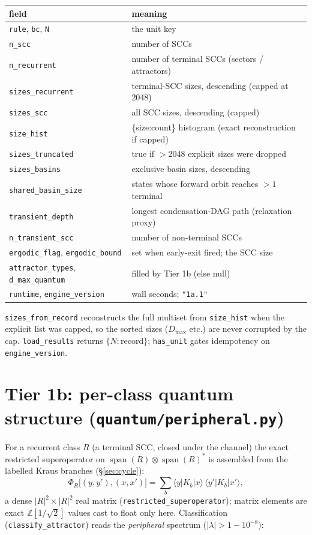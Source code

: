\documentclass[11pt]{article}
\newcommand{\rt}[1]{\texttt{#1}}
\newcommand{\pf}[1]{\texttt{#1}}          %
\newcommand{\fn}[1]{\texttt{#1}}          %
\providecommand{\ket}[1]{|#1\rangle}
\providecommand{\bra}[1]{\langle #1|}
\newcommand{\Zh}{\mathbb{Z}[1/\sqrt2]}
\begin{document}
\begin{center}\small
\begin{tabular}{@{}ll@{}}
\toprule
field & meaning \\
\midrule
\rt{rule}, \rt{bc}, \rt{N} & the unit key \\
\rt{n\_scc} & number of SCCs \\
\rt{n\_recurrent} & number of terminal SCCs (sectors / attractors) \\
\rt{sizes\_recurrent} & terminal-SCC sizes, descending (capped at 2048) \\
\rt{sizes\_scc} & all SCC sizes, descending (capped) \\
\rt{size\_hist} & \{size:count\} histogram (exact reconstruction if capped) \\
\rt{sizes\_truncated} & true if $>$2048 explicit sizes were dropped \\
\rt{sizes\_basins} & exclusive basin sizes, descending \\
\rt{shared\_basin\_size} & states whose forward orbit reaches $>1$ terminal \\
\rt{transient\_depth} & longest condensation-DAG path (relaxation proxy) \\
\rt{n\_transient\_scc} & number of non-terminal SCCs \\
\rt{ergodic\_flag}, \rt{ergodic\_bound} & set when early-exit fired; the SCC size \\
\rt{attractor\_types}, \rt{d\_max\_quantum} & filled by Tier 1b (else null) \\
\rt{runtime}, \rt{engine\_version} & wall seconds; \rt{"1a.1"} \\
\bottomrule
\end{tabular}
\end{center}

\fn{sizes\_from\_record} reconstructs the full multiset from \rt{size\_hist} when
the explicit list was capped, so the sorted sizes ($D_{\max}$ etc.) are never
corrupted by the cap. \fn{load\_results} returns $\{N:\text{record}\}$;
\fn{has\_unit} gates idempotency on \rt{engine\_version}.

\section{Tier 1b: per-class quantum structure (\pf{quantum/peripheral.py})}
\label{sec:tier1b}
For a recurrent class $R$ (a terminal SCC, closed under the channel) the exact
restricted superoperator on $\operatorname{span}(R)\otimes\operatorname{span}(R)^*$
is assembled from the labelled Kraus branches (\S\ref{sec:cycle}):
\begin{equation}
\Phi_R\big[(y,y'),(x,x')\big]=\sum_b \bra{y}K_b\ket{x}\,\overline{\bra{y'}K_b\ket{x'}},
\label{eq:phiR}
\end{equation}
a dense $|R|^2\times|R|^2$ real matrix (\fn{restricted\_superoperator}); matrix
elements are exact $\Zh$ values cast to float only here. Classification
(\fn{classify\_attractor}) reads the \emph{peripheral} spectrum
($|\lambda|>1-10^{-8}$):
\end{document}
